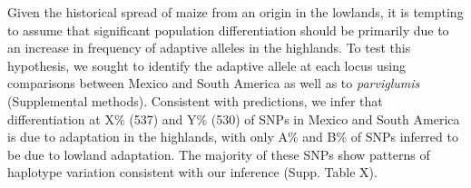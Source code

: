 {{Given the historical spread of maize from an origin in the lowlands, it is tempting to assume that significant population differentiation should be primarily due to an increase in frequency of adaptive alleles in the highlands.
To test this hypothesis, we sought to identify the adaptive allele at each locus using comparisons between Mexico and South America as well as to \emph{parviglumis} (Supplemental methods).
%
%
%
%
Consistent with predictions, we infer that differentiation at X\% (537) and Y\% (530) of SNPs in Mexico and South America is due to adaptation in the highlands, with only A\% and B\% of SNPs inferred to be due to lowland adaptation. The majority of these SNPs show patterns of haplotype variation consistent with our inference (Supp. Table X).
}}
